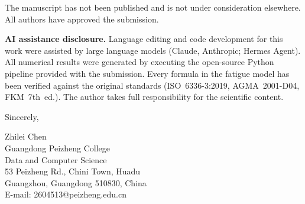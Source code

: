 \documentclass[12pt,a4paper]{article}
\begin{document}
\vspace{6pt}

\noindent The manuscript has not been published and is not under
consideration elsewhere. All authors have approved the submission.

\vspace{6pt}

\noindent\textbf{AI assistance disclosure.}
Language editing and code development for this work were assisted by
large language models (Claude, Anthropic; Hermes Agent). All numerical
results were generated by executing the open-source Python pipeline
provided with the submission. Every formula in the fatigue model has
been verified against the original standards (ISO~6336-3:2019,
AGMA~2001-D04, FKM~7th~ed.). The author takes full responsibility for
the scientific content.

\vspace{12pt}

\noindent Sincerely,

\vspace{18pt}

\noindent Zhilei Chen \\
Guangdong Peizheng College \\
Data and Computer Science \\
53 Peizheng Rd., Chini Town, Huadu \\
Guangzhou, Guangdong 510830, China \\
E-mail: 2604513@peizheng.edu.cn
\end{document}
